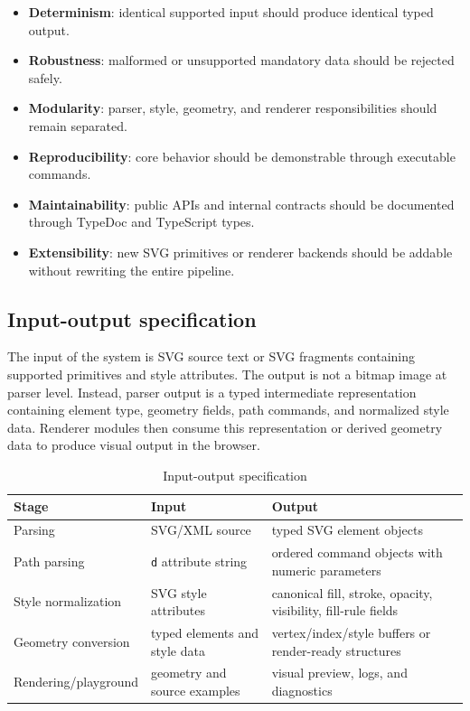 \begin{itemize}
\item \textbf{Determinism}: identical supported input should produce identical typed output.
\item \textbf{Robustness}: malformed or unsupported mandatory data should be rejected safely.
\item \textbf{Modularity}: parser, style, geometry, and renderer responsibilities should remain separated.
\item \textbf{Reproducibility}: core behavior should be demonstrable through executable commands.
\item \textbf{Maintainability}: public APIs and internal contracts should be documented through TypeDoc and TypeScript types.
\item \textbf{Extensibility}: new SVG primitives or renderer backends should be addable without rewriting the entire pipeline.
\end{itemize}

\subsection{Input-output specification}

The input of the system is SVG source text or SVG fragments containing supported primitives and style attributes.
The output is not a bitmap image at parser level.
Instead, parser output is a typed intermediate representation containing element type, geometry fields, path commands, and normalized style data.
Renderer modules then consume this representation or derived geometry data to produce visual output in the browser.

\begin{table}[htbp]
\centering
\caption{Input-output specification}
\label{tab:io_specification}
\begin{tabular}{>{\raggedright\arraybackslash}p{3.2cm} >{\raggedright\arraybackslash}p{4.2cm} >{\raggedright\arraybackslash}p{5.2cm}}
\toprule
\textbf{Stage} & \textbf{Input} & \textbf{Output} \\
\midrule
Parsing & SVG/XML source & typed SVG element objects \\
Path parsing & \texttt{d} attribute string & ordered command objects with numeric parameters \\
Style normalization & SVG style attributes & canonical fill, stroke, opacity, visibility, fill-rule fields \\
Geometry conversion & typed elements and style data & vertex/index/style buffers or render-ready structures \\
Rendering/playground & geometry and source examples & visual preview, logs, and diagnostics \\
\bottomrule
\end{tabular}
\end{table}

